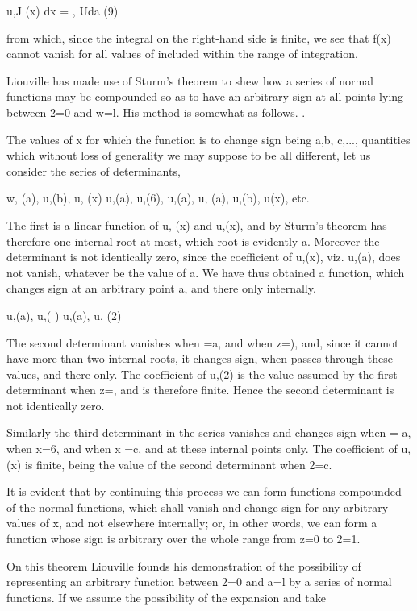u,J (x) dx = , Uda (9)

from which, since the integral on the right-hand side is finite, we see
that f(x) cannot vanish for all values of included within the range of
integration.

Liouville has made use of Sturm's theorem to shew how a series of normal
functions may be compounded so as to have an arbitrary sign at all
points lying between 2=0 and w=l. His method is somewhat as follows. .

The values of x for which the function is to change sign being a,b,
c,..., quantities which without loss of generality we may suppose to be
all different, let us consider the series of determinants,

w, (a), u,(b), u, (x) u,(a), u,(6), u,(a), u, (a), u,(b), u(x), etc.

The first is a linear function of u, (x) and u,(x), and by Sturm's
theorem has therefore one internal root at most, which root is evidently
a. Moreover the determinant is not identically zero, since the
coefficient of u,(x), viz. u,(a), does not vanish, whatever be the value
of a. We have thus obtained a function, which changes sign at an
arbitrary point a, and there only internally.

u,(a), u,( ) u,(a), u, (2)


The second determinant vanishes when =a, and when z=), and, since it
cannot have more than two internal roots, it changes sign, when passes
through these values, and there only. The coefficient of u,(2) is the
value assumed by the first determinant when z=, and is therefore finite.
Hence the second determinant is not identically zero.

Similarly the third determinant in the series vanishes and changes sign
when = a, when x=6, and when x =c, and at these internal points only.
The coefficient of u,(x) is finite, being the value of the second
determinant when 2=c.

It is evident that by continuing this process we can form functions
compounded of the normal functions, which shall vanish and change sign
for any arbitrary values of x, and not elsewhere internally; or, in
other words, we can form a function whose sign is arbitrary over the
whole range from z=0 to 2=1.

On this theorem Liouville founds his demonstration of the possibility of
representing an arbitrary function between 2=0 and a=l by a series of
normal functions. If we assume the possibility of the expansion and take

